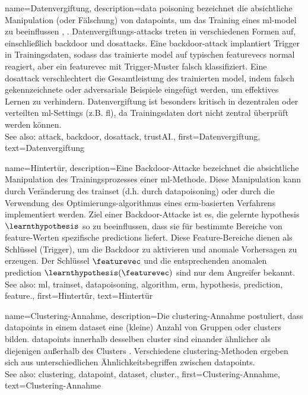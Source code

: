 {{{{
{name={Datenvergiftung}, 
	description={\Gls{data} poisoning bezeichnet die absichtliche Manipulation 
  		(oder Fälschung) von \glspl{datapoint}, um das Training eines \gls{ml}-\gls{model} zu beeinflussen \cite{Liu2021}, \cite{PoisonGAN}. 
  		Datenvergiftungs-\glspl{attack} treten in verschiedenen Formen auf, einschließlich \gls{backdoor} und \glspl{dosattack}.
  		Eine \gls{backdoor}-\gls{attack} implantiert Trigger in Trainingsdaten, sodass das trainierte \gls{model} 
  		auf typischen \glspl{featurevec} normal reagiert, aber ein \gls{featurevec} mit Trigger-Muster falsch klassifiziert.
  		Eine \gls{dosattack} verschlechtert die Gesamtleistung des trainierten \gls{model}, indem falsch gekennzeichnete oder 
  		adversariale Beispiele eingefügt werden, um effektives Lernen zu verhindern.
		Datenvergiftung ist besonders kritisch in dezentralen oder verteilten \gls{ml}-Settings (z.B. \gls{fl}), 
		da Trainingsdaten dort nicht zentral überprüft werden können.
		\\
		See also: \gls{attack}, \gls{backdoor}, \gls{dosattack}, \gls{trustAI}.},
	first={Datenvergiftung},
	text={Datenvergiftung} 
}

{name={Hintertür}, 
	description={Eine Backdoor-Attacke bezeichnet die absichtliche Manipulation des Trainingsprozesses einer \gls{ml}-Methode. 
		Diese Manipulation kann durch Veränderung des \gls{trainset} (d.h. durch \gls{datapoisoning}) oder durch die 
		Verwendung des Optimierungs-\gls{algorithmus} eines \gls{erm}-basierten Verfahrens implementiert werden. 
		Ziel einer Backdoor-Attacke ist es, die gelernte \gls{hypothesis} $\learnthypothesis$ 
		so zu beeinflussen, dass sie für bestimmte Bereiche von \gls{feature}-Werten spezifische \glspl{prediction} liefert. 
		Diese Feature-Bereiche dienen als Schlüssel (Trigger), um die Backdoor zu aktivieren und anomale Vorhersagen zu erzeugen. 
		Der Schlüssel $\featurevec$ und die entsprechenden anomalen \gls{prediction} $\learnthypothesis(\featurevec)$ sind nur dem Angreifer bekannt.
		\\
		See also: \gls{ml}, \gls{trainset}, \gls{datapoisoning}, \gls{algorithm}, \gls{erm}, \gls{hypothesis}, \gls{prediction}, \gls{feature}.},
	first={Hintertür},
	text={Hintertür} 
}

{name={Clustering-Annahme}, 
	description={Die 
		\gls{clustering}-Annahme postuliert, dass \glspl{datapoint} in einem \gls{dataset} eine (kleine) Anzahl von Gruppen oder \glspl{cluster} bilden. 
		\glspl{datapoint} innerhalb desselben \gls{cluster} sind einander ähnlicher als diejenigen außerhalb des Clusters \cite{SemiSupervisedBook}. 
		Verschiedene \gls{clustering}-Methoden ergeben sich aus unterschiedlichen Ähnlichkeitsbegriffen zwischen \glspl{datapoint}.
		\\
		See also: \gls{clustering}, \gls{datapoint}, \gls{dataset}, \gls{cluster}.},
	first={Clustering-Annahme},
	text={Clustering-Annahme} 
}

}}}}
